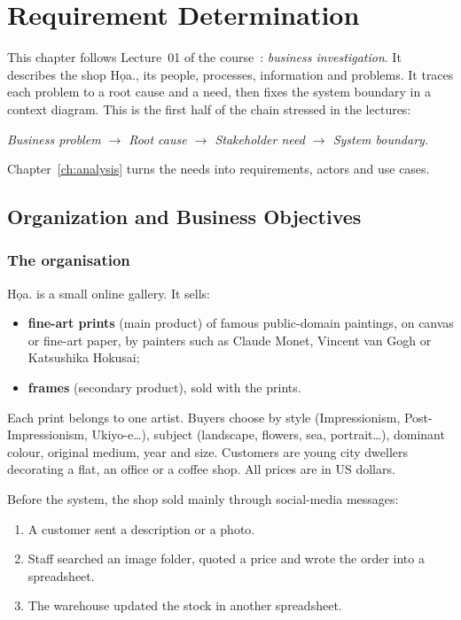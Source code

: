 \chapter{Requirement Determination}\label{ch:req}\label{ch:1}

This chapter follows Lecture~01 of the course~\cite{slidesL01}: \emph{business investigation}. It describes the
shop Họa., its people, processes, information and problems. It traces each problem to a root cause and a need, then
fixes the system boundary in a context diagram. This is the first half of the chain stressed in the lectures:
\begin{center}
\emph{Business problem $\rightarrow$ Root cause $\rightarrow$ Stakeholder need $\rightarrow$ System boundary.}
\end{center}
Chapter~\ref{ch:analysis} turns the needs into requirements, actors and use cases.

\section{Organization and Business Objectives}\label{sec:1.2}

\subsection{The organisation}

Họa. is a small online gallery. It sells:
\begin{itemize}
\item \textbf{fine-art prints} (main product) of famous public-domain paintings, on canvas or fine-art paper, by
      painters such as Claude Monet, Vincent van Gogh or Katsushika Hokusai;
\item \textbf{frames} (secondary product), sold with the prints.
\end{itemize}
Each print belongs to one artist. Buyers choose by style (Impressionism, Post-Impressionism, Ukiyo-e\dots), subject
(landscape, flowers, sea, portrait\dots), dominant colour, original medium, year and size. Customers are young city
dwellers decorating a flat, an office or a coffee shop. All prices are in US dollars.

Before the system, the shop sold mainly through social-media messages:
\begin{enumerate}
\item A customer sent a description or a photo.
\item Staff searched an image folder, quoted a price and wrote the order into a spreadsheet.
\item The warehouse updated the stock in another spreadsheet.
\end{enumerate}

